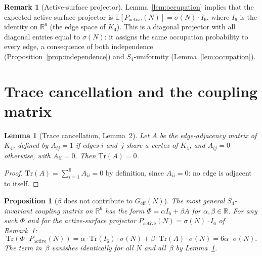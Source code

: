 \documentclass[11pt,a4paper]{article}
\newtheorem{proposition}[theorem]{Proposition}
\newtheorem{lemma}[theorem]{Lemma}
\theoremstyle{definition}
\newtheorem{remark}[theorem]{Remark}
\newcommand{\Geff}{G_{\mathrm{eff}}}
\newcommand{\sig}{\sigma}
\newcommand{\Kfour}{K_4}
\begin{document}
\begin{remark}[Active-surface projector]
\label{rem:projector}
Lemma~\ref{lem:occupation} implies that the expected active-surface projector is $\mathbb{E}[P_{\mathrm{active}}(N)] = \sig(N)\cdot I_6$, where $I_6$ is the identity on $\mathbb{R}^6$ (the edge space of $\Kfour$). This is a diagonal projector with all diagonal entries equal to $\sig(N)$: it assigns the same occupation probability to every edge, a consequence of both independence (Proposition~\ref{prop:independence}) and $S_4$-uniformity (Lemma~\ref{lem:occupation}).
\end{remark}

\section{Trace cancellation and the coupling matrix}
\label{sec:trace}

\begin{lemma}[Trace cancellation, Lemma~2]
\label{lem:trace}
Let $A$ be the edge-adjacency matrix of $\Kfour$, defined by $A_{ij} = 1$ if edges $i$ and~$j$ share a vertex of $\Kfour$, and $A_{ij} = 0$ otherwise, with $A_{ii} = 0$. Then $\mathrm{Tr}(A) = 0$.
\end{lemma}

\begin{proof}
$\mathrm{Tr}(A) = \sum_{i=1}^{6} A_{ii} = 0$ by definition, since $A_{ii} = 0$: no edge is adjacent to itself.
\end{proof}

\begin{proposition}[$\beta$ does not contribute to $\Geff(N)$]
\label{prop:beta}
The most general $S_4$-invariant coupling matrix on $\mathbb{R}^6$ has the form $\Phi = \alpha I_6 + \beta A$ for $\alpha,\beta\in\mathbb{R}$. For any such $\Phi$ and for the active-surface projector $P_{\mathrm{active}}(N) = \sig(N)\cdot I_6$ of Remark~\ref{rem:projector}:
\begin{equation}
\mathrm{Tr}(\Phi\cdot P_{\mathrm{active}}(N)) = \alpha\cdot\mathrm{Tr}(I_6)\cdot\sig(N) + \beta\cdot\mathrm{Tr}(A)\cdot\sig(N) = 6\alpha\cdot\sig(N). \label{eq:trace_result}
\end{equation}
The term in~$\beta$ vanishes identically for all $N$ and all~$\beta$ by Lemma~\ref{lem:trace}.
\end{proposition}
\end{document}

